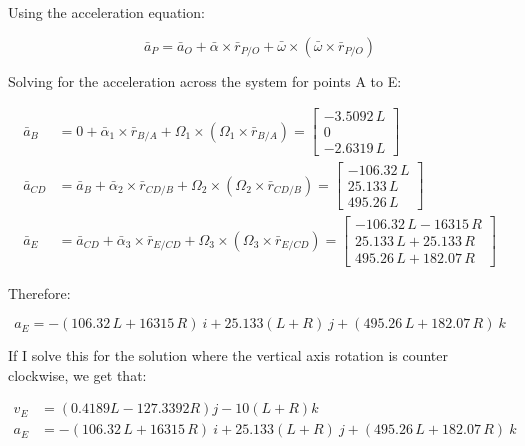 \documentclass[12pt, letterpaper]{../assignment}
\begin{document}
Using the acceleration equation:

$$ \bar{a}_P = \bar{a}_O + \bar{\alpha} \times \bar{r}_{P/O} + \bar{\omega} \times \left( \bar{\omega} \times \bar{r}_{P/O} \right)$$

Solving for the acceleration across the system for points A to E:

\begin{equation*}
    \begin{aligned}
        \bar{a}_B &= 0 + \bar{\alpha}_1 \times \bar{r}_{B/A} + \Omega_1 \times \left(\Omega_1 \times \bar{r}_{B/A}\right)
        =\left[\begin{array}{c} -3.5092\,L\\ 0\\ -2.6319\,L \end{array}\right]\\
        \bar{a}_{CD} &= \bar{a}_B + \bar{\alpha}_2 \times \bar{r}_{CD/B} + \Omega_2 \times \left(\Omega_2 \times \bar{r}_{CD/B}\right)
        =\left[\begin{array}{c} -106.32\,L\\ 25.133\,L\\ 495.26\,L \end{array}\right]\\
        \bar{a}_E &= \bar{a}_{CD} + \bar{\alpha}_3 \times \bar{r}_{E/CD} + \Omega_3 \times \left(\Omega_3 \times \bar{r}_{E/CD}\right)
        =\left[\begin{array}{c} -106.32\,L-16315\,R\\ 25.133\,L+25.133\,R\\ 495.26\,L+182.07\,R \end{array}\right]
    \end{aligned}
\end{equation*}

Therefore:

\begin{answer}
$$ a_E = -(106.32\,L+16315\,R)\ i + 25.133(L+R)\ j + (495.26\,L+182.07\,R)\ k $$
\end{answer}


If I solve this for the solution where the vertical axis rotation is counter clockwise,
we get that:

\begin{answer}
    \begin{equation*}
        \begin{aligned}
    v_E &= \left( 0.4189L - 127.3392R \right)j - 10 \left(L+R\right)k \\
    a_E &= -(106.32\,L+16315\,R)\ i + 25.133(L+R)\ j + (495.26\,L+182.07\,R)\ k 
\end{aligned}
\end{equation*}
\end{answer}
    
\end{document}

